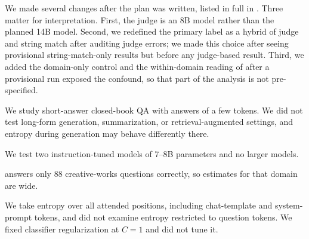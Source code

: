 We made several changes after the plan was written, listed in full in .
Three matter for interpretation.
First, the judge is an 8B model rather than the planned 14B model.
Second, we redefined the primary label as a hybrid of judge and string match after auditing judge errors; we made this choice after seeing provisional string-match-only results but before any judge-based result.
Third, we added the domain-only control and the within-domain reading of \Htwo after a provisional run exposed the confound, so that part of the analysis is not pre-specified.

We study short-answer closed-book QA with answers of a few tokens.
We did not test long-form generation, summarization, or retrieval-augmented settings, and entropy during generation may behave differently there.

We test two instruction-tuned models of 7--8B parameters and no larger models.

\qwen answers only 88 creative-works questions correctly, so estimates for that domain are wide.

We take entropy over all attended positions, including chat-template and system-prompt tokens, and did not examine entropy restricted to question tokens.
We fixed classifier regularization at $C=1$ and did not tune it.
